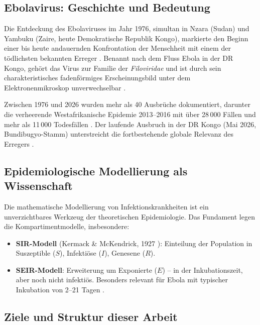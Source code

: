 ﻿\documentclass[12pt,a4paper]{article}
\theoremstyle{definition}
\theoremstyle{plain}
\theoremstyle{remark}
\begin{document}
\subsection{Ebolavirus: Geschichte und Bedeutung}

Die Entdeckung des Ebolaviruses im Jahr 1976, simultan in Nzara (Sudan) und
Yambuku (Zaire, heute Demokratische Republik Kongo), markierte den Beginn einer
bis heute andauernden Konfrontation der Menschheit mit einem der tödlichsten
bekannten Erreger \cite{johnson1977,bowen1977}. Benannt nach dem Fluss Ebola
in der DR Kongo, gehört das Virus zur Familie der \textit{Filoviridae} und ist
durch sein charakteristisches fadenförmiges Erscheinungsbild unter dem
Elektronenmikroskop unverwechselbar \cite{murphy1978}.

Zwischen 1976 und 2026 wurden mehr als 40 Ausbrüche dokumentiert, darunter
die verheerende Westafrikanische Epidemie 2013--2016 mit über 28\,000 Fällen
und mehr als 11\,000 Todesfällen \cite{who2016report}. Der laufende Ausbruch
in der DR Kongo (Mai 2026, Bundibugyo-Stamm) unterstreicht die fortbestehende
globale Relevanz des Erregers \cite{who2026drc}.

\subsection{Epidemiologische Modellierung als Wissenschaft}

Die mathematische Modellierung von Infektionskrankheiten ist ein unverzichtbares
Werkzeug der theoretischen Epidemiologie. Das Fundament legen die Kompartimentmodelle,
insbesondere:
\begin{itemize}
  \item \textbf{SIR-Modell} (Kermack \& McKendrick, 1927 \cite{kermack1927}):
    Einteilung der Population in Suszeptible ($S$), Infektiöse ($I$), Genesene ($R$).
  \item \textbf{SEIR-Modell}: Erweiterung um Exponierte ($E$) -- in der Inkubationszeit,
    aber noch nicht infektiös. Besonders relevant für Ebola mit typischer
    Inkubation von 2--21 Tagen \cite{WHO2014incubation}.
\end{itemize}

\subsection{Ziele und Struktur dieser Arbeit}
\end{document}
